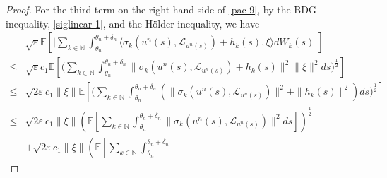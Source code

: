 \documentclass[11pt]{article}
\numberwithin{equation}{section}
\theoremstyle{plain}
\begin{document}
\begin{proof}
 For the third term on the right-hand side of \eqref{pac-9},
 by the BDG inequality, \eqref{siglinear-1}, and
 the  H\"{o}lder inequality,
 we have 
 \begin{align} \label{pac-17}  
       & \sqrt{\varepsilon} 
           \mathbb{E} 
                  \left[ 
                           \Big| \sum_{k \in \mathbb{N} } 
                                          \int_{\theta_n}^{\theta_n + \delta_n} 
                                               \langle \sigma_k(u^n(s), \mathcal{L}_{u^n(s)}) + h_k(s),
                                                           \xi
                                               \rangle dW_k(s)
                           \Big|
                   \right]  \nonumber \\
 \le & \sqrt{\varepsilon} c_1
           \mathbb{E} 
                  \left[ 
                          \Big( \sum_{k \in \mathbb{N} } 
                                         \int_{\theta_n}^{\theta_n + \delta_n} 
                                              \| \sigma_k(u^n(s), \mathcal{L}_{u^n(s)}) + h_k(s) \|^2
                                              \| \xi \|^2 ds
                          \Big)^\frac{1}{2}
                  \right]  \nonumber \\     
 \le & \sqrt{2\varepsilon} c_1  \| \xi \|
           \mathbb{E} 
                  \left[ 
                          \Big( \sum_{k \in \mathbb{N} } 
                                         \int_{\theta_n}^{\theta_n + \delta_n} 
                                             \left( \| \sigma_k(u^n(s), \mathcal{L}_{u^n(s)}) \|^2
                                                      + \| h_k(s) \|^2
                                             \right)
                                         ds
                          \Big)^\frac{1}{2}
                  \right]  \nonumber \\ 
 \le & \sqrt{2\varepsilon} c_1  \| \xi \|
                \left( \mathbb{E} 
                               \left[ \sum_{k \in \mathbb{N} } 
                                               \int_{\theta_n}^{\theta_n + \delta_n} 
                                                        \| \sigma_k(u^n(s), \mathcal{L}_{u^n(s)}) \|^2
                                                ds
                               \right] 
                  \right)^{\frac{1}{2} }  \nonumber\\
       & + \sqrt{2\varepsilon} c_1  \| \xi \|
                    \left( \mathbb{E}
                                    \left[ \sum_{k \in \mathbb{N} } 
                                                     \int_{\theta_n}^{\theta_n + \delta_n} 

\end{align}
\end{proof}
\end{document}

